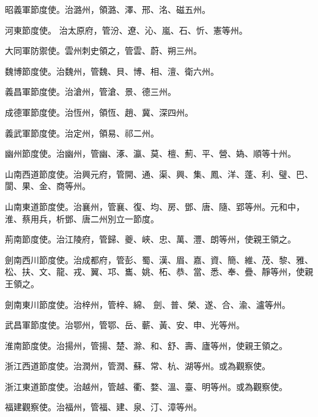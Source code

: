 \begin{pinyinscope}
 昭義軍節度使。治潞州，領潞、澤、邢、洺、磁五州。



 河東節度使。
 治太原府，管汾、遼、沁、嵐、石、忻、憲等州。



 大同軍防禦使。雲州刺史領之，管雲、蔚、朔三州。



 魏博節度使。治魏州，管魏、貝、博、相、澶、衛六州。



 義昌軍節度使。治滄州，管滄、景、德三州。



 成德軍節度使。治恆州，領恆、趙、冀、深四州。



 義武軍節度使。治定州，領易、祁二州。



 幽州節度使。治幽州，管幽、涿、瀛、莫、檀、薊、平、營、媯、順等十州。



 山南西道節度使。治興元府，管開、通、渠、興、集、鳳、洋、蓬、利、璧、巴、閬、果、金、商等州。



 山南東道節度使。治襄州，管襄、復、均、房、鄧、唐、隨、郢等州。元和中，淮、蔡用兵，析鄧、唐二州別立一節度。



 荊南節度使。治江陵府，管歸、夔、峽、忠、萬、灃、朗等州，使親王領之。



 劍南西川節度使。治成都府，管彭、蜀、漢、眉、嘉、資、簡、維、茂、黎、雅、松、扶、文、龍、戎、翼、邛、巂、姚、柘、恭、當、悉、奉、疊、靜等州，使親王領之。



 劍南東川節度使。治梓州，管梓、綿、
 劍、普、榮、遂、合、渝、瀘等州。



 武昌軍節度使。治鄂州，管鄂、岳、蘄、黃、安、申、光等州。



 淮南節度使。治揚州，管揚、楚、滁、和、舒、壽、廬等州，使親王領之。



 浙江西道節度使。治潤州，管潤、蘇、常、杭、湖等州。或為觀察使。



 浙江東道節度使。治越州，管越、衢、婺、溫、臺、明等州。或為觀察使。



 福建觀察使。治福州，管福、建、泉、汀、漳等州。




\end{pinyinscope}
